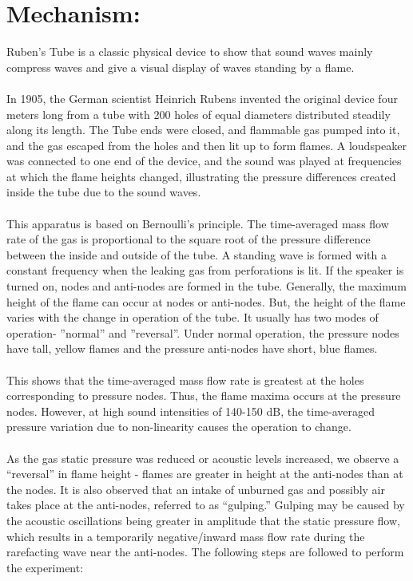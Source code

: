 \documentclass[12pt,a4paper]{article}
\begin{document}
\section{Mechanism:}
Ruben’s Tube is a classic physical device to show that sound waves mainly compress waves and give a visual display of waves standing by a flame.\\
\\In 1905, the German scientist Heinrich Rubens invented the original device four meters long from a tube with 200 holes of equal diameters distributed steadily along its length. The Tube ends were closed, and flammable gas pumped into it, and the gas escaped from the holes and then lit up to form flames. A loudspeaker was connected to one end of the device, and the sound was played at frequencies at which the flame heights changed, illustrating the pressure differences created inside the tube due to the sound waves.\\
\\This apparatus is based on Bernoulli’s principle. The time-averaged mass flow rate of the gas is proportional to the square root of the pressure difference between the inside and outside of the tube. A standing wave is formed with a constant frequency when the leaking gas from perforations is lit. If the speaker is turned on, nodes and anti-nodes are formed in the tube. Generally, the maximum height of the flame can occur at nodes or anti-nodes. But, the height of the flame varies with the change in operation of the tube. It usually has two modes of operation- ”normal” and ”reversal”. Under normal operation, the pressure nodes have tall, yellow flames and the pressure anti-nodes have short, blue flames.\\
\\ This shows that the time-averaged mass flow rate is greatest at the holes corresponding to pressure nodes. Thus, the flame maxima occurs at the pressure nodes. However, at high sound intensities of 140-150 dB, the time-averaged pressure variation due to non-linearity causes the operation to change.\\
\\As the gas static pressure was reduced or acoustic levels increased, we observe a “reversal” in flame height - flames are greater in height at the anti-nodes than at the nodes. It is also observed that an intake of unburned gas and possibly air takes place at the anti-nodes, referred to as “gulping.” Gulping may be caused by the acoustic oscillations being greater in amplitude
that the static pressure flow, which results in a temporarily negative/inward mass flow rate during the rarefacting wave near the anti-nodes. The following steps are followed to perform the experiment:\\
\end{document}
